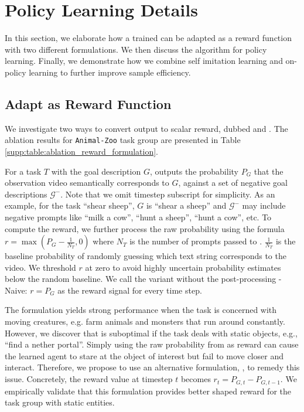 \section{Policy Learning Details}
\label{supp:sec:rl}

In this section, we elaborate how a trained \mineclip can be adapted as a reward function with two different formulations. We then discuss the algorithm for policy learning. Finally, we demonstrate how we combine self imitation learning and on-policy learning to further improve sample efficiency. 

\subsection{Adapt \mineclip as Reward Function}
\label{supp:sec:rl_mineclip_to_reward}
We investigate two ways to convert \mineclip output to scalar reward, dubbed \direct and \rdelta. The ablation results for \texttt{Animal-Zoo} task group are presented in Table \ref{supp:table:ablation_reward_formulation}.

 For a task $T$ with the goal description $G$, \mineclip outputs the probability $P_G$ that the observation video semantically corresponds to $G$, against a set of negative goal descriptions $\mathcal{G}^-$. Note that we omit timestep subscript for simplicity. As an example, for the task ``shear sheep'', $G$ is ``shear a sheep'' and $\mathcal{G}^-$ may include negative prompts like ``milk a cow'', ``hunt a sheep'', ``hunt a cow'', etc. 
To compute the \direct reward, we further process the raw probability using the formula  $r = \max( P_G - \frac{1}{N_T}, 0)$ where $N_T$ is the number of prompts passed to \mineclip. $\frac{1}{N_T}$ is the baseline probability of randomly guessing which text string corresponds to the video. We threshold $r$ at zero to avoid highly uncertain probability estimates below the random baseline. We call the variant without the post-processing \direct-Naive: $r = P_G$ as the reward signal for every time step.

 The \direct formulation yields strong performance when the task is concerned with moving creatures, e.g. farm animals and monsters that run around constantly. However, we discover that \direct is suboptimal if the task deals with static objects, e.g., ``find a nether portal''. Simply using the raw probability from \mineclip as reward can cause the learned agent to stare at the object of interest but fail to move closer and interact. Therefore, we propose to use an alternative formulation, \rdelta, to remedy this issue. Concretely, the reward value at timestep $t$ becomes $r_t = P_{G, t} - P_{G, t - 1}$. We empirically validate that this formulation provides better shaped reward for the task group with static entities. 


